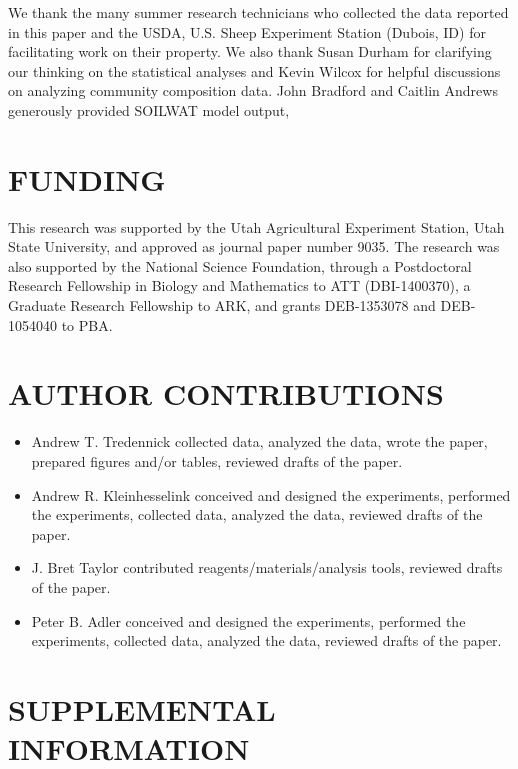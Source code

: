 \documentclass[fleqn,10pt,lineno]{wlpeerj} %
\begin{document}
We thank the many summer research technicians who collected the data
reported in this paper and the USDA, U.S. Sheep Experiment Station
(Dubois, ID) for facilitating work on their property. We also thank
Susan Durham for clarifying our thinking on the statistical analyses and
Kevin Wilcox for helpful discussions on analyzing community composition
data. John Bradford and Caitlin Andrews generously provided SOILWAT
model output,

\hypertarget{funding}{%
\section{FUNDING}\label{funding}}

This research was supported by the Utah Agricultural Experiment Station,
Utah State University, and approved as journal paper number 9035. The
research was also supported by the National Science Foundation, through
a Postdoctoral Research Fellowship in Biology and Mathematics to ATT
(DBI-1400370), a Graduate Research Fellowship to ARK, and grants
DEB-1353078 and DEB-1054040 to PBA.

\hypertarget{author-contributions}{%
\section{AUTHOR CONTRIBUTIONS}\label{author-contributions}}

\begin{itemize}
  \item Andrew T. Tredennick collected data, analyzed the data, wrote the paper, prepared figures and/or tables, reviewed drafts of the paper.
  \item Andrew R. Kleinhesselink conceived and designed the experiments, performed the experiments, collected data, analyzed the data, reviewed drafts of the paper.
  \item J. Bret Taylor contributed reagents/materials/analysis tools, reviewed drafts of the paper.
  \item Peter B. Adler conceived and designed the experiments, performed the experiments, collected data, analyzed the data, reviewed drafts of the paper.
\end{itemize}

\hypertarget{supplemental-information}{%
\section{SUPPLEMENTAL INFORMATION}\label{supplemental-information}}
\end{document}
